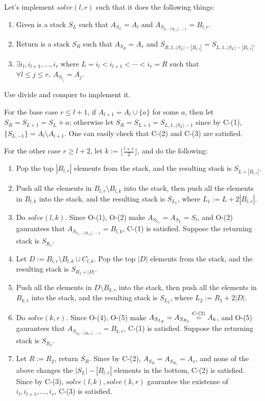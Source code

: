 \begin{pr}
Let's implement $solve(l, r)$ such that it does the following things:
\begin{enumerate}[C-(1)]
\item Given is a stack $S_L$ such that $A_{S_L}=A_l$ and $A_{S_{L, -|B_{l, r}|..-1}}=B_{l, r}$.
\item Return is a stack $S_R$ such that $A_{S_R}=A_r$ and $S_{R, 1..|S_L|-|B_{l, r}|}=S_{L, 1..|S_L|-|B_{l, r}|}$.
\item $\exists i_l, i_{l+1}, \dots, i_r$ where $L=i_l<i_{l+1}<\cdots<i_r=R$ such that $\forall l\leq j\leq r,\ A_{S_{i_j}}=A_j$.
\end{enumerate}

Use divide and conquer to implement it.

For the base case $r\leq l+1$, if $A_{l+1}=A_l\cup\{a\}$ for some $a$, then let $S_R=S_{L+1}=S_L+a$; otherwise let $S_R=S_{L+1}=S_{L, 1..|S_L|-1}$ since by C-(1), $\{S_{L, -1}\}=A_l\setminus A_{l+1}$. One can easily check that C-(2) and C-(3) are satisfied.

For the other case $r\geq l+2$, let $k:=\lfloor\frac{l+r}2\rfloor$, and do the following:
\begin{enumerate}[O-(1)]
\item Pop the top $|B_{l, r}|$ elements from the stack, and the resulting stack is $S_{L+|B_{l, r}|}$.
\item Push all the elements in $B_{l, r}\setminus B_{l, k}$ into the stack, then push all the elements in $B_{l, k}$ into the stack, and the resulting stack is $S_{L_1}$, where $L_1:=L+2|B_{l, r}|$.
\item Do $solve(l, k)$. Since O-(1), O-(2) make $A_{S_{L_1}}=A_{S_L}=S_l$, and O-(2) gaurantees that $A_{S_{L_1, -|B_{l, k}|..-1}}=B_{l, k}$, C-(1) is satisfied. Suppose the returning stack is $S_{R_1}$.
\item Let $D:=B_{l, r}\setminus B_{l, k}\cup C_{l, k}$. Pop the top $|D|$ elements from the stack, and the resulting stack is $S_{R_1+|D|}$.
\item Push all the elements in $D\setminus B_{k, r}$ into the stack, then push all the elements in $B_{k, r}$ into the stack, and the resulting stack is $S_{L_2}$, where $L_2:=R_1+2|D|$.
\item Do $solve(k, r)$. Since O-(4), O-(5) make $A_{S_{L_2}}=A_{S_{R_1}}\overset{\text{C-(2)}}=A_k$, and O-(5) gaurantees that $A_{S_{L_2, -|B_{k, r}|..-1}}=B_{k, r}$, C-(1) is satisfied. Suppose the returning stack is $S_{R_2}$.
\item Let $R:=R_2$, return $S_R$. Since by C-(2), $A_{S_R}=A_{S_{R_2}}=A_r$, and none of the above changes the $|S_L|-|B_{l, r}|$ elements in the bottom, C-(2) is satisfied. Since by C-(3), $solve(l, k), solve(k, r)$ gaurantee the existense of $i_l, i_{l+1}, \dots, i_r$, C-(3) is satisfied.
\end{enumerate}


\end{pr}
